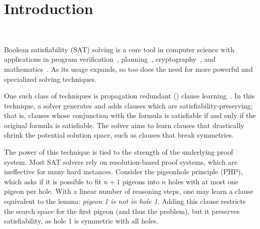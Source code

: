 \section{Introduction}~\label{sec:intro}


Boolean satisfiability (SAT) solving is a core tool in computer science with
applications in program
verification~\cite{BillionQueries,sat-hardwareverification,ic3,bmc},
planning~\cite{planning,planningassat}, cryptography~\cite{cryptominisat}, and
mathematics~\cite{chromaticnumber,pythagoreantriples,kellersconjecture,emptyhexagon}.
As its usage expands, so too does the need for more powerful and specialized
solving techniques.



One such class of techniques is propagation redundant (\pr) clause
learning~\cite{prclauses}. In this technique, a solver generates and adds
clauses which are satisfiability-preserving; that is, clauses whose conjunction
with the formula is satisfiable if and only if the original formula is
satisfiable. The solver aims to learn clauses that drastically shrink the
potential solution space, such as clauses that break symmetries.




The power of this technique is tied to the strength of the underlying proof
system. Most SAT solvers rely on resolution-based proof systems, which are
ineffective for many hard instances. Consider the pigeonhole principle (PHP),
which asks if it is possible to fit $n+1$ pigeons into $n$ holes with at most
one pigeon per hole. With a linear number of \pr reasoning steps, one may learn
a \pr clause equivalent to the lemma: \emph{pigeon 1 is not in hole 1}. Adding
this clause restricts the search space for the first pigeon (and thus the
problem), but it preserves satisfiability, as hole 1 is symmetric with all
holes. 

